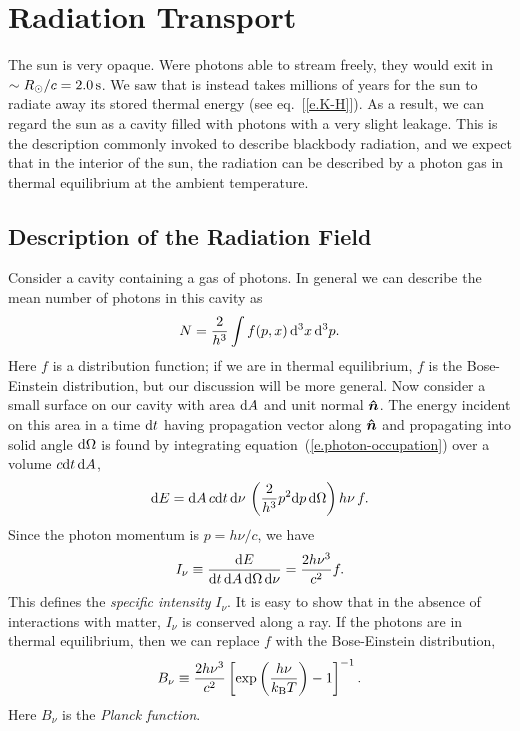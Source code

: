 \chapter{Radiation Transport}


The sun is very opaque.  Were photons able to stream freely, they would exit in $\sim R_{\odot}/c = 2.0\,\mathrm{s}$.  We saw that is instead takes millions of years for the sun to radiate away its stored thermal energy (see eq.~[\ref{e.K-H}]).  As a result, we can regard the sun as a cavity filled with photons with a very slight leakage.  This is the description commonly invoked to describe blackbody radiation, and we expect that in the interior of the sun, the radiation can be described by a photon gas in thermal equilibrium at the ambient temperature.

\section{Description of the Radiation Field}

Consider a cavity containing a gas of photons. In general we can describe the mean number of photons in this cavity as
\begin{equation}\label{e.photon-occupation}
 N = \frac{2}{h^{3}}\int f(p,x)\,\mathrm{d}^{3}x\,\mathrm{d}^{3}p.
\end{equation}
Here $f$ is a distribution function; if we are in thermal equilibrium, $f$ is the Bose-Einstein distribution, but our discussion will be more general.  Now consider a small surface on our cavity with area $\mathrm{d} A$ and unit normal $\boldsymbol{\hat{n}}$.  The energy incident on this area in a time $\mathrm{d} t$ having propagation vector along $\boldsymbol{\hat{n}}$ and propagating into solid angle $\mathrm{d}\Omega$ is found by integrating equation~(\ref{e.photon-occupation}) over a volume $c\mathrm{d} t\,\mathrm{d} A$,
\[
\mathrm{d} E = \mathrm{d} A\,c\mathrm{d} t\,\mathrm{d}\nu\,\left( \frac{2}{h^{3}}p^{2}\mathrm{d} p\,\mathrm{d}\Omega\right)  h\nu \, f.
\]
Since the photon momentum is $p = h\nu/c$, we have
\begin{equation}\label{e.specific-intensity}
I_{\nu} \equiv \frac{\mathrm{d} E}{\mathrm{d} t\,\mathrm{d} A\,\mathrm{d}\Omega\,\mathrm{d}\nu} = \frac{2h\nu^{3}}{c^{2}} f.
\end{equation}
This defines the \emph{specific intensity} $I_{\nu}$.  It is easy to show that in the absence of interactions with matter, $I_{\nu}$ is conserved along a ray.  If the photons are in thermal equilibrium, then we can replace $f$ with the Bose-Einstein distribution,
\begin{equation}\label{e.Bnu}
B_{\nu} \equiv \frac{2 h\nu^{3}}{c^{2}} \left[\exp\left(\frac{h\nu}{k_\mathrm{B} T}\right)-1\right]^{-1}.
\end{equation}
Here $B_{\nu}$ is the \emph{Planck function}.

